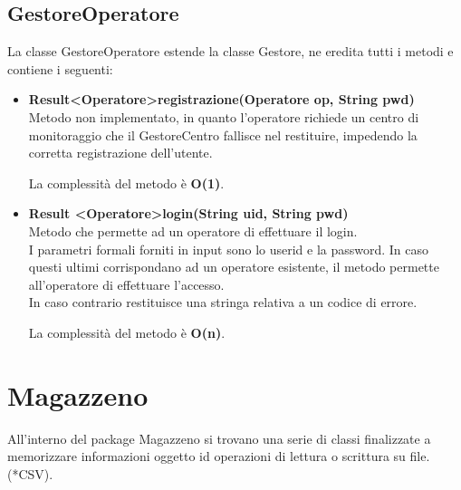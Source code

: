 \documentclass[a4paper, 12pt]{scrreprt}
\begin{document}
			\subsection{GestoreOperatore}
			La classe GestoreOperatore estende la classe Gestore, ne eredita tutti i metodi e contiene i seguenti:
			\begin{itemize}
				\item \textbf{Result\textless Operatore\textgreater registrazione(Operatore op, String pwd)}
				\\Metodo non implementato, in quanto l'operatore richiede un centro di monitoraggio che il GestoreCentro fallisce nel restituire, impedendo la corretta registrazione  dell'utente.
				
				La complessit\`a del metodo è \textbf{O(1)}.
				
				\item \textbf{Result \textless Operatore\textgreater login(String uid, String pwd)}
				\\Metodo che permette ad un operatore di effettuare il login.
				\\I parametri formali forniti in input sono lo userid e la password. In caso questi ultimi corrispondano ad un operatore esistente, il metodo permette all'operatore di effettuare l'accesso.
				\\In caso contrario restituisce una stringa relativa a un codice di errore.
				
				La complessit\`a del metodo \`e \textbf{O(n)}.
			\end{itemize}


		\section{Magazzeno}
		All'interno del package Magazzeno si trovano una serie di classi finalizzate a memorizzare informazioni oggetto id operazioni di lettura o scrittura su file.(*CSV).
\end{document}
